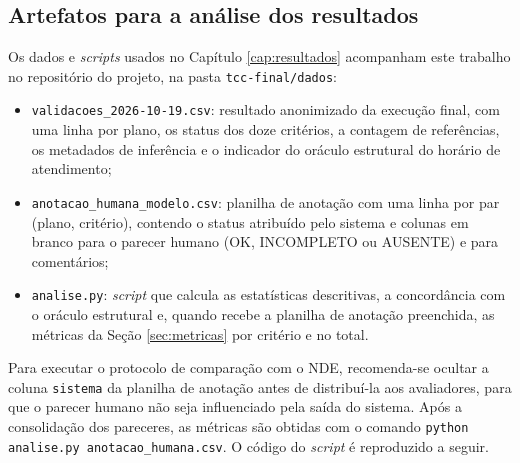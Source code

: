 \begin{apendicesenv}
\chapter{Artefatos para a análise dos resultados}
\label{ap:analise}

Os dados e \textit{scripts} usados no Capítulo \ref{cap:resultados} acompanham este trabalho no repositório do projeto, na pasta \texttt{tcc-final/dados}:

\begin{itemize}
    \item \texttt{validacoes\_2026-10-19.csv}: resultado anonimizado da execução final, com uma linha por plano, os status dos doze critérios, a contagem de referências, os metadados de inferência e o indicador do oráculo estrutural do horário de atendimento;
    \item \texttt{anotacao\_humana\_modelo.csv}: planilha de anotação com uma linha por par (plano, critério), contendo o status atribuído pelo sistema e colunas em branco para o parecer humano (OK, INCOMPLETO ou AUSENTE) e para comentários;
    \item \texttt{analise.py}: \textit{script} que calcula as estatísticas descritivas, a concordância com o oráculo estrutural e, quando recebe a planilha de anotação preenchida, as métricas da Seção \ref{sec:metricas} por critério e no total.
\end{itemize}

Para executar o protocolo de comparação com o NDE, recomenda-se ocultar a coluna \texttt{sistema} da planilha de anotação antes de distribuí-la aos avaliadores, para que o parecer humano não seja influenciado pela saída do sistema. Após a consolidação dos pareceres, as métricas são obtidas com o comando \texttt{python analise.py anotacao\_humana.csv}. O código do \textit{script} é reproduzido a seguir.



\end{apendicesenv}
